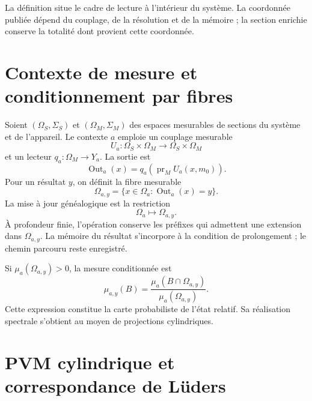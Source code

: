La définition situe le cadre de lecture à l'intérieur du système. La
coordonnée publiée dépend du couplage, de la résolution et de la
mémoire ; la section enrichie conserve la totalité dont provient cette
coordonnée.

\section{Contexte de mesure et conditionnement par fibres}

Soient \((\Omega_S,\Sigma_S)\) et \((\Omega_M,\Sigma_M)\) des espaces mesurables
de sections du système et de l'appareil. Le contexte \(a\) emploie un
couplage mesurable
\begin{equation}
 U_a:\Omega_S\times\Omega_M
 \longrightarrow\Omega_S\times\Omega_M
 \label{eq:rm-obs-measurable-coupling}
\end{equation}
et un lecteur \(q_a:\Omega_M\to Y_a\). La sortie est
\begin{equation}
 \operatorname{Out}_a(x)
 =q_a\!\left(\operatorname{pr}_M U_a(x,m_0)\right).
 \label{eq:rm-obs-output}
\end{equation}
Pour un résultat \(y\), on définit la fibre mesurable
\begin{equation}
 \Omega_{a,y}
 =\{x\in\Omega_a:\operatorname{Out}_a(x)=y\}.
 \label{eq:rm-obs-outcome-fiber}
\end{equation}
La mise à jour généalogique est la restriction
\begin{equation}
 \Omega_a\longmapsto\Omega_{a,y}.
 \label{eq:rm-obs-genealogical-update}
\end{equation}
À profondeur finie, l'opération conserve les préfixes qui admettent une
extension dans \(\Omega_{a,y}\). La mémoire du résultat s'incorpore à la
condition de prolongement ; le chemin parcouru reste enregistré.

Si \(\mu_a(\Omega_{a,y})>0\), la mesure conditionnée est
\begin{equation}
 \mu_{a,y}(B)
 =\frac{\mu_a(B\cap\Omega_{a,y})}
 {\mu_a(\Omega_{a,y})}.
 \label{eq:rm-obs-conditional-measure}
\end{equation}
Cette expression constitue la carte probabiliste de l'état relatif.
Sa réalisation spectrale s'obtient au moyen de projections cylindriques.

\section{PVM cylindrique et correspondance de Lüders}

